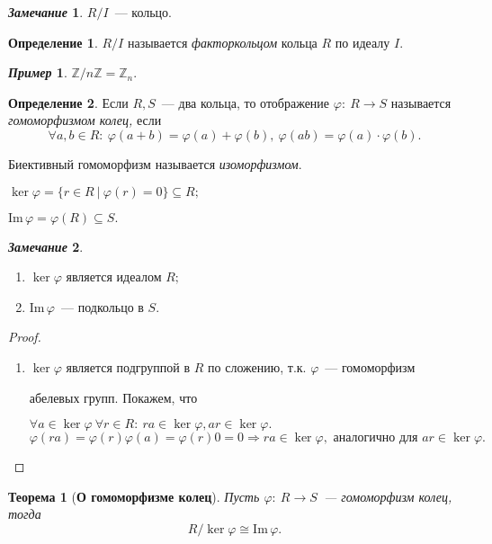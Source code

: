 \documentclass[a4paper, 14pt]{extarticle}
\newcommand{\n}{\par}
\newcommand{\integers}{\mathbb{Z}}
\newcommand{\im}{\mathrm{Im} \,}
\renewcommand{\phi}{\varphi}
\theoremstyle{definition}
\newtheorem*{exmpl*}{\textit{Пример}}
\newtheorem*{remark}{\textit{Замечание}}
\newtheorem{definition}{Определение}
\theoremstyle{plain}
\newtheorem*{theorem*}{Теорема}
\numberwithin{theorem}{section}
\numberwithin{definition}{section}
\numberwithin{statement}{section}
\numberwithin{lemma}{section}
\numberwithin{consequence}{section}
\begin{document}
		\begin{remark}
			$R/I$~--- кольцо.
		\end{remark}
		\begin{definition}
			$R/I$ называется \textit{факторкольцом} кольца $R$ по идеалу $I.$
		\end{definition}
		\begin{exmpl*}
			$\integers/n\integers = \integers_n.$
		\end{exmpl*}
		\begin{definition}
			Если $R, S$~--- два кольца, то отображение ${\phi{:} \ R \rightarrow S}$ называется \textit{гомоморфизмом колец,} если
			\begin{equation*}
				\forall a,b \in R{:} \ \phi(a + b) = \phi(a) + \phi(b), \ \phi(ab) = \phi(a) \cdot \phi(b).
			\end{equation*} \n
			Биективный гомоморфизм называется \textit{изоморфизмом}.\n
			${\ker \phi = \{r \in R \ | \ \phi(r) = 0\} \subseteq R;}$ \n
			${\im \phi = \phi(R) \subseteq S.}$
		\end{definition}
		\begin{remark}
			\
			\begin{enumerate}
				\setlength\itemsep{0.25em}
				\item $\ker \phi$ является идеалом $R;$
				\item $\im \phi$~--- подкольцо в $S.$
			\end{enumerate}
		\end{remark}
		\begin{proof}
			\
			\begin{enumerate}
				\setlength\itemsep{0.25em}
				\item $\ker \phi$ является подгруппой в $R$ по сложению, т.к. $\phi$~--- гомоморфизм \n
				абелевых групп. Покажем, что \n ${\forall a \in \ker \phi \ \forall r \in R{:} \ ra \in \ker \phi, ar \in \ker \phi.}$ 
				\begin{equation*}
					\phi(ra) = \phi(r)\phi(a) = \phi(r)0 = 0 \Longrightarrow ra \in \ker \phi, \text{ аналогично для } ar \in \ker \phi.
				\end{equation*}
			\end{enumerate}
		\end{proof}
		\newpage
		\begin{theorem*}[\textbf{О гомоморфизме колец}]
			Пусть ${\phi{:} \ R \rightarrow S}$~--- гомоморфизм колец, тогда
			\begin{equation*}
				R/\ker \phi \cong \im \phi.
			\end{equation*}
		\end{theorem*}
\end{document}
